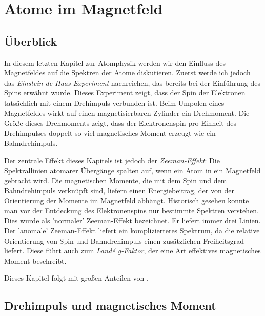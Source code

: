 \renewcommand{\lastmod}{2. Dezember 2024}
\renewcommand{\chapterauthors}{Markus Lippitz}

\chapter{Atome im Magnetfeld}






\section{Überblick}

In diesem letzten Kapitel zur Atomphysik werden wir den Einfluss des Magnetfeldes auf die Spektren der Atome diskutieren. Zuerst werde ich jedoch das \emph{Einstein-de Haas-Experiment} nachreichen, das bereits bei der Einführung des Spins erwähnt wurde. Dieses Experiment zeigt, dass der Spin der Elektronen tatsächlich mit einem Drehimpuls verbunden ist. Beim Umpolen eines Magnetfeldes wirkt auf einen magnetisierbaren Zylinder ein Drehmoment. Die Größe dieses Drehmoments zeigt, dass der Elektronenspin pro Einheit des Drehimpulses doppelt so viel magnetisches Moment erzeugt wie ein Bahndrehimpuls.

Der zentrale Effekt dieses Kapitels ist jedoch der \emph{Zeeman-Effekt}: Die Spektrallinien atomarer Übergänge spalten auf, wenn ein Atom in ein Magnetfeld gebracht wird. Die magnetischen Momente, die mit dem Spin und dem Bahndrehimpuls verknüpft sind, liefern einen Energiebeitrag, der von der Orientierung der Momente im Magnetfeld abhängt. Historisch gesehen konnte man vor der Entdeckung des Elektronenspins nur bestimmte Spektren verstehen. Dies wurde als 'normaler' Zeeman-Effekt bezeichnet. Er liefert immer drei Linien. Der 'anomale' Zeeman-Effekt liefert ein komplizierteres Spektrum, da die relative Orientierung von Spin und Bahndrehimpuls einen zusätzlichen Freiheitsgrad liefert. Diese führt auch zum \emph{Landé g-Faktor}, der eine Art effektives magnetisches Moment beschreibt.

Dieses Kapitel folgt \cite{Harris_moderne_Physik} mit großen Anteilen von \cite{Demtröder_ep3}.





\section{Drehimpuls und magnetisches Moment}

